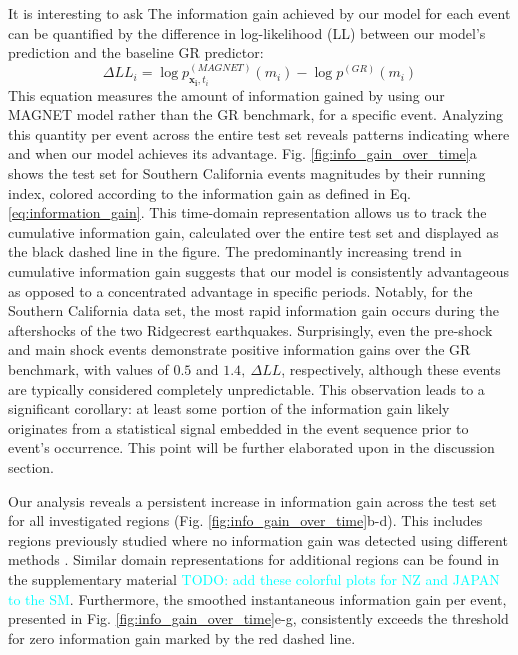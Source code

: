 \documentclass[pdflatex]{sn-jnl}
\newcommand{\neri}[1]{{\textcolor{cyan}{#1}}}
\begin{document}
It is interesting to ask The information gain achieved by our model for each event can be quantified by the difference in log-likelihood (LL) between our model's prediction and the baseline GR predictor:
\begin{equation}
    \Delta LL_i = \log{p_{\pmb{x_i}, t_i}^{(MAGNET)}(m_i)} - \log{p^{(GR)}(m_i)}
    \label{eq:information_gain}
\end{equation}
This equation measures the amount of information gained by using our MAGNET model rather than the GR benchmark, for a specific event. Analyzing this quantity per event across the entire test set reveals patterns indicating where and when our model achieves its advantage. Fig. \ref{fig:info_gain_over_time}a shows the test set for Southern California events magnitudes by their running index, colored according to the information gain as defined in Eq. \ref{eq:information_gain}. This time-domain representation allows us to track the cumulative information gain, calculated over the entire test set and displayed as the black dashed line in the figure. The predominantly increasing trend in cumulative information gain suggests that our model is consistently advantageous as opposed to a concentrated advantage in specific periods. Notably, for the Southern California data set, the most rapid information gain occurs during the aftershocks of the two Ridgecrest earthquakes. Surprisingly, even the pre-shock and main shock events demonstrate positive information gains over the GR benchmark, with values of $0.5$ and $1.4, \ \Delta LL$, respectively, although these events are typically considered completely unpredictable. This observation leads to a significant corollary: at least some portion of the information gain likely originates from a statistical signal embedded in the event sequence prior to event's occurrence. This point will be further elaborated upon in the discussion section.
\newline

Our analysis reveals a persistent increase in information gain across the test set for all investigated regions (Fig. \ref{fig:info_gain_over_time}b-d). This includes regions previously studied where no information gain was detected using different methods  \cite{ogata_exploring_2018}. Similar domain representations for additional regions can be found in the supplementary material  \neri{TODO: add these colorful plots for NZ and JAPAN to the SM}. Furthermore, the smoothed instantaneous information gain per event, presented in Fig. \ref{fig:info_gain_over_time}e-g, consistently exceeds the threshold for zero information gain marked by the red dashed line.
\end{document}
